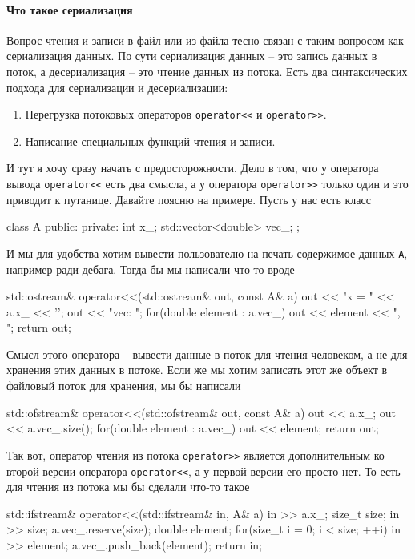 \paragraph{Что такое сериализация}

Вопрос чтения и записи в файл или из файла тесно связан с таким вопросом как сериализация данных.
По сути сериализация данных -- это запись данных в поток, а десериализация -- это чтение данных из потока.
Есть два синтаксических подхода для сериализации и десериализации:
\begin{enumerate}
\item Перегрузка потоковых операторов \verb"operator<<" и \verb"operator>>".

\item Написание специальных функций чтения и записи.
\end{enumerate}
И тут я хочу сразу начать с предосторожности.
Дело в том, что у оператора вывода \verb"operator<<" есть два смысла, а у оператора \verb"operator>>" только один и это приводит к путанице.
Давайте поясню на примере.
Пусть у нас есть класс
\begin{cppcode}
class A {
public:
private:
  int x_;
  std::vector<double> vec_;
};
\end{cppcode}
И мы для удобства хотим вывести пользователю на печать содержимое данных \verb"A", например ради дебага.
Тогда бы мы написали что-то вроде
\begin{cppcode}
std::ostream& operator<<(std::ostream& out, const A& a) {
  out << "x = " << a.x_ << '\n';
  out << "vec: ";
  for(double element : a.vec_)
    out << element << ", ";
  return out;
}
\end{cppcode}
Смысл этого оператора -- вывести данные в поток для чтения человеком, а не для хранения этих данных в потоке.
Если же мы хотим записать этот же объект в файловый поток для хранения, мы бы написали
\begin{cppcode}
std::ofstream& operator<<(std::ofstream& out, const A& a) {
  out << a.x_;
  out << a.vec_.size();
  for(double element : a.vec_)
    out << element;
  return out;
}
\end{cppcode}
Так вот, оператор чтения из потока \verb"operator>>" является дополнительным ко второй версии оператора \verb"operator<<", а у первой версии его просто нет.
То есть для чтения из потока мы бы сделали что-то такое
\begin{cppcode}
std::ifstream& operator<<(std::ifstream& in, A& a) {
  in >> a.x_;
  size_t size;
  in >> size;
  a.vec_.reserve(size);
  double element;
  for(size_t i = 0; i < size; ++i) {
    in >> element;
    a.vec_.push_back(element);
  }
  return in;
}
\end{cppcode}
